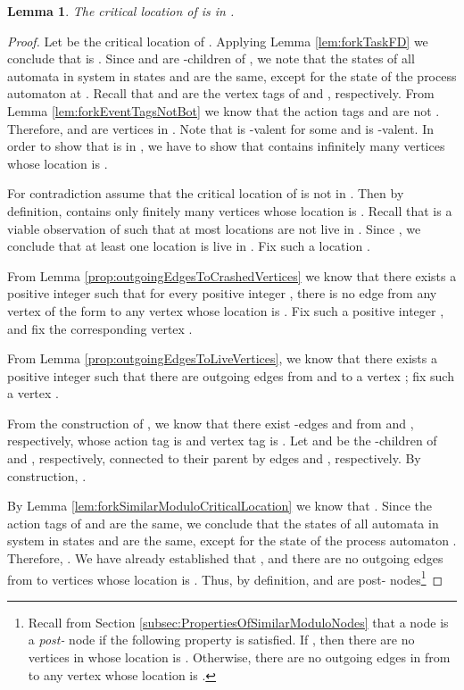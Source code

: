 \documentclass[11pt]{article}
\numberwithin{theorem}{section}
\newtheorem{lemma}[theorem]{Lemma}
\begin{document}
\begin{lemma}\label{thm:forkCriticalProcessCorrect}
The critical location of  is in .
\end{lemma}
\begin{proof}
 Let  be the critical location of . Applying Lemma \ref{lem:forkTaskFD} we conclude that  is . Since  and  are -children of , we note that the states of all automata in system  in states  and  are the same, except for the state of the process automaton at . Recall that  and  are the vertex tags of  and , respectively. From Lemma \ref{lem:forkEventTagsNotBot} we know that the action tags  and  are not . Therefore,  and  are vertices in .
Note that  is -valent for some  and  is -valent. In order to show that  is in , we have to show that  contains infinitely many vertices whose location is .


For contradiction assume that the critical location  of  is not in . Then by definition,  contains only finitely many vertices whose location is . 
Recall that  is a viable observation of  such that at most  locations are not live in . Since ,
we conclude that at least one location is live in . Fix such a location .

From Lemma \ref{prop:outgoingEdgesToCrashedVertices} we know that there exists a positive integer  such that for every positive integer , there is no edge from any vertex of the form  to any vertex whose location is . Fix such a positive integer , and fix the corresponding vertex .

From Lemma \ref{prop:outgoingEdgesToLiveVertices}, we know that there exists a positive integer  such that there are outgoing edges from  and  to a vertex ; fix such a vertex .

From the construction of , we know that there exist -edges  and  from  and , respectively, whose action tag is  and vertex tag is . Let  and  be the -children of  and , respectively, connected to their parent by edges  and , respectively. By construction, . 



By Lemma \ref{lem:forkSimilarModuloCriticalLocation} we know that . Since the action tags of  and  are the same, we conclude that the states of all automata in system  in states  and  are the same, except for the state of the process automaton . Therefore, . We have already established that , and there are no outgoing edges from  to vertices whose location is . Thus, by definition,  and  are post- nodes\footnote{Recall from Section \ref{subsec:PropertiesOfSimilarModuloNodes} that a node  is a \emph{post-} node if the following property is satisfied. If , then there are no vertices in  whose location is . Otherwise, there are no outgoing edges in  from  to any vertex whose location is .}






\end{proof}
\end{document}
